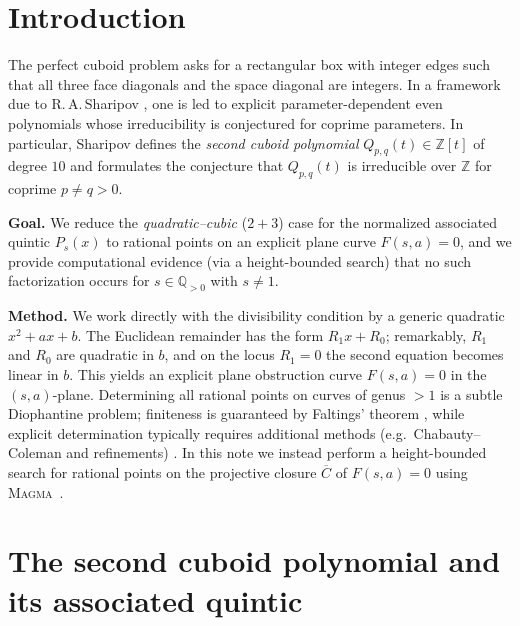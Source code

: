 \documentclass[12pt]{article}
\theoremstyle{remark}
\theoremstyle{definition}
\begin{document}

\section{Introduction}\label{sec:intro}

The perfect cuboid problem asks for a rectangular box with integer edges such that all three face diagonals and the space diagonal are integers.
In a framework due to R.\,A.\,Sharipov \cite{Sharipov2011Cuboids,Sharipov2011Note}, one is led to explicit parameter-dependent even polynomials whose irreducibility is conjectured for coprime parameters.
In particular, Sharipov defines the \emph{second cuboid polynomial} $Q_{p,q}(t)\in\mathbb{Z}[t]$ of degree $10$ and formulates the conjecture that $Q_{p,q}(t)$ is irreducible over $\mathbb{Z}$ for coprime $p\neq q>0$.

\medskip
\noindent\textbf{Goal.}
We reduce the \emph{quadratic--cubic} ($2+3$) case for the normalized associated quintic $P_s(x)$ to rational points on an explicit plane curve $F(s,a)=0$, and we provide computational evidence (via a height-bounded search) that no such factorization occurs for $s\in\mathbb{Q}_{>0}$ with $s\neq 1$.

\medskip
\noindent\textbf{Method.}
We work directly with the divisibility condition by a generic quadratic $x^{2}+ax+b$.
The Euclidean remainder has the form $R_1x+R_0$; remarkably, $R_1$ and $R_0$ are quadratic in $b$, and on the locus $R_1=0$ the second equation becomes linear in $b$.
This yields an explicit plane obstruction curve $F(s,a)=0$ in the $(s,a)$-plane.
Determining all rational points on curves of genus $>1$ is a subtle Diophantine problem; finiteness is guaranteed by Faltings' theorem \cite{Faltings1983}, while explicit determination typically requires additional methods (e.g.\ Chabauty--Coleman and refinements) \cite{Chabauty1941,Coleman1985,Stoll2006}.
In this note we instead perform a height-bounded search for rational points on the projective closure $\overline{C}$ of $F(s,a)=0$ using \textsc{Magma}~\cite{Magma}.


\section{The second cuboid polynomial and its associated quintic}\label{sec:poly}
\end{document}
